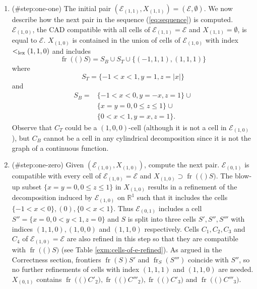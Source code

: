 \documentclass[
]{book}
\theoremstyle{definition}
\theoremstyle{definition}
\theoremstyle{definition}
\theoremstyle{definition}
\theoremstyle{remark}
\begin{document}
\begin{enumerate}
\def\labelenumi{\arabic{enumi}.}
\item
  (\#step:one-one)
  The initial pair \((\mathcal{E}_{(1,1)}, X_{(1,1)}) = (\mathcal{E}, \emptyset)\). We now describe how the next pair in the sequence (\ref{eq:sequence}) is computed.
  \(\mathcal{E}_{(1,0)}\), the CAD compatible with all cells of \(\mathcal{E}_{(1,1)}= \mathcal{E}\) and \(X_{(1,1)} = \emptyset\), is equal to \(\mathcal{E}\). \(X_{(1,0)}\) is contained in the union of cells of \(\mathcal{E}_{(1,0)}\) with index \(<_{\rm{lex}}(1,1,0)\) and includes
  \[
  {\operatorname{fr} \left( ( \right)}S) = S_B \cup S_T \cup \{ (-1,1,1), (1,1,1) \}
  \]
  where
  \[
  S_T = \{ -1 < x < 1, y = 1, z = \vert x \vert \}
  \]
  and
  \begin{align*}
  S_B = &\{ -1 < x < 0, y = -x, z = 1 \} \cup \\
  & \{ x = y = 0, 0 \le z \le 1 \} \cup\\
  & \{ 0 < x < 1, y = x, z = 1 \}.
  \end{align*}
  Observe that \(C_T\) could be a \((1,0,0)\)-cell (although it is not a cell in \(\mathcal{E}_{(1,0)}\)), but \(C_B\) cannot be a cell in any cylindrical decomposition since it is not the graph of a continuous function.
\item
  (\#step:one-zero)
  Given \((\mathcal{E}_{(1,0)}, X_{(1,0)})\), compute the next pair.
  \(\mathcal{E}_{(0,1)}\) is compatible with every cell of \(\mathcal{E}_{(1,0)} = \mathcal{E}\) and \(X_{(1,0)} \supset {\operatorname{fr} \left( ( \right)}S)\).
  The blow-up subset \(\{ x = y = 0, 0 \le z \le 1 \}\) in \(X_{(1,0)}\) results in a refinement of the decomposition induced by \(\mathcal{E}_{(1,0)}\) on \(\mathbb{R}^1\) such that it includes the cells \(\{-1 < x < 0\}, (0), \{ 0 < x < 1 \}\). Thus \(\mathcal{E}_{(0,1)}\) includes a cell \(S'' = \{ x = 0, 0 < y < 1, z = 0 \}\) and \(S\) is split into three cells \(S', S'', S'''\) with indices \((1,1,0),(1,0,0)\) and \((1,1,0)\) respectively.
  Cells \(C_1,C_2,C_3\) and \(C_4\) of \(\mathcal{E}_{(1,0)} = \mathcal{E}\) are also refined in this step so that they are compatible with \({\operatorname{fr} \left( ( \right)}S)\) (see Table \ref{exm:cells-of-e-refined}). As argued in the Correctness section, frontiers \({\operatorname{fr} \left( S \right)}{S'}\) and \({\operatorname{fr}_{S} \left( S''' \right)}\) coincide with \(S''\), so no further refinements of cells with index \((1,1,1)\) and \((1,1,0)\) are needed.
  \(X_{(0,1)}\) contains \({\operatorname{fr} \left( ( \right)}C'_2), {\operatorname{fr} \left( ( \right)}C'''_2), {\operatorname{fr} \left( ( \right)}C'_3)\) and \({\operatorname{fr} \left( ( \right)}C'''_3)\).

\end{enumerate}
\end{document}
